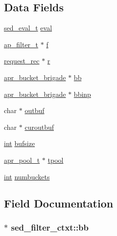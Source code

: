 \subsection*{Data Fields}
\begin{DoxyCompactItemize}
\item 
\hyperlink{libsed_8h_ae6ec8323971a67e199713c75fd7873bf}{sed\+\_\+eval\+\_\+t} \hyperlink{structsed__filter__ctxt_a4948d127c8012229590fdaab6d3c001f}{eval}
\item 
\hyperlink{structap__filter__t}{ap\+\_\+filter\+\_\+t} $\ast$ \hyperlink{structsed__filter__ctxt_a0fedbc9d766c45772a92a2deebd99502}{f}
\item 
\hyperlink{structrequest__rec}{request\+\_\+rec} $\ast$ \hyperlink{structsed__filter__ctxt_adee4c54aa441589086e554225da086f8}{r}
\item 
\hyperlink{structapr__bucket__brigade}{apr\+\_\+bucket\+\_\+brigade} $\ast$ \hyperlink{structsed__filter__ctxt_a77ce051e0570337fd80a367014f45fcd}{bb}
\item 
\hyperlink{structapr__bucket__brigade}{apr\+\_\+bucket\+\_\+brigade} $\ast$ \hyperlink{structsed__filter__ctxt_a3524d23821a3de0ffb8a730888ca90b8}{bbinp}
\item 
char $\ast$ \hyperlink{structsed__filter__ctxt_a46da5cbcfef5f9fbb46631615c8e6819}{outbuf}
\item 
char $\ast$ \hyperlink{structsed__filter__ctxt_adcaab2591bc383514da1ef9a6c18faab}{curoutbuf}
\item 
\hyperlink{pcre_8txt_a42dfa4ff673c82d8efe7144098fbc198}{int} \hyperlink{structsed__filter__ctxt_afa3d664a82fc3c0c66aad7a3083e1a8b}{bufsize}
\item 
\hyperlink{structapr__pool__t}{apr\+\_\+pool\+\_\+t} $\ast$ \hyperlink{structsed__filter__ctxt_a8de2d80895b2336d2893681b7b74981b}{tpool}
\item 
\hyperlink{pcre_8txt_a42dfa4ff673c82d8efe7144098fbc198}{int} \hyperlink{structsed__filter__ctxt_a686087aebd42d5c1e81565a1d677486e}{numbuckets}
\end{DoxyCompactItemize}


\subsection{Field Documentation}
\subsubsection[{\texorpdfstring{bb}{bb}}]{$\ast$ sed\+\_\+filter\+\_\+ctxt\+::bb}\hypertarget{structsed__filter__ctxt_a77ce051e0570337fd80a367014f45fcd}{}\label{structsed__filter__ctxt_a77ce051e0570337fd80a367014f45fcd}
